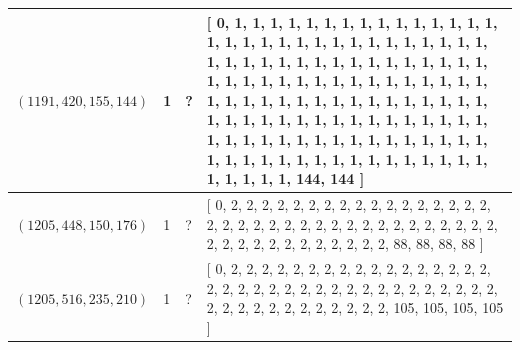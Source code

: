 \documentclass[12pt]{amsproc} %
\theoremstyle{definition}\newtheorem{defn}[thm]{Definition}
\theoremstyle{definition}\newtheorem{rem}[thm]{Remark}
\theoremstyle{definition}\newtheorem{ex}[thm]{Example}
\begin{document}
\begin{center}
\begin{longtable}{p{3.66cm}|P{0.8cm}|P{0.69cm}|p{10cm}}
		\hline
		 $(1191, 420, 155, 144)$  & 1 & ? & [ 0, 1, 1, 1, 1, 1, 1, 1, 1, 1, 1, 1, 1, 1, 1, 1, 1, 1, 1, 1, 1, 1, 1, 1, 1, 1, 1, 1, 1, 1, 1, 1, 1, 1, 1, 1, 1, 1, 1, 1, 1, 1, 1, 1, 1, 1, 1, 1, 1, 1, 1, 1, 1, 1, 1, 1, 1, 1, 1, 1, 1, 1, 1, 1, 1, 1, 1, 1, 1, 1, 1, 1, 1, 1, 1, 1, 1, 1, 1, 1, 1, 1, 1, 1, 1, 1, 1, 1, 1, 1, 1, 1, 1, 1, 1, 1, 1, 1, 1, 1, 1, 1, 1, 1, 1, 1, 1, 1, 1, 1, 1, 1, 1, 1, 1, 1, 1, 1, 1, 1, 1, 1, 1, 1, 1, 1, 1, 1, 1, 1, 1, 1, 1, 144, 144 ] \\
		\hline
		 $(1205, 448, 150, 176)$  & 1 & ? & [ 0, 2, 2, 2, 2, 2, 2, 2, 2, 2, 2, 2, 2, 2, 2, 2, 2, 2, 2, 2, 2, 2, 2, 2, 2, 2, 2, 2, 2, 2, 2, 2, 2, 2, 2, 2, 2, 2, 2, 2, 2, 2, 2, 2, 2, 2, 2, 2, 2, 88, 88, 88, 88 ] \\
		\hline
		 $(1205, 516, 235, 210)$  & 1 & ? & [ 0, 2, 2, 2, 2, 2, 2, 2, 2, 2, 2, 2, 2, 2, 2, 2, 2, 2, 2, 2, 2, 2, 2, 2, 2, 2, 2, 2, 2, 2, 2, 2, 2, 2, 2, 2, 2, 2, 2, 2, 2, 2, 2, 2, 2, 2, 2, 2, 2, 105, 105, 105, 105 ] \\
		\hline
	\end{longtable}
\end{center}
\end{document}
